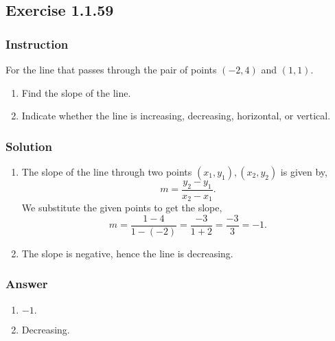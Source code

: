 \subsection*{Exercise 1.1.59}

\subsubsection*{Instruction}

For the line that passes through the pair of points $(-2, 4) $ and $ (1,1)$.

\begin{enumerate}[label = (\alph*)]
  \item
    Find the slope of the line.
  \item
    Indicate whether the line is increasing, decreasing, horizontal, or vertical.

\end{enumerate}

\subsubsection*{Solution}

\begin{enumerate}[label = (\alph*)]
  \item
    The slope of the line through two points $(x_1, y_1), (x_2, y_2)$ is given by,
    \[ \phantom{.} m = \frac{y_2 - y_1}{x_2 - x_1}. \]
    We substitute the given points to get the slope,
    \[ \phantom{.} m = \frac{1 - 4}{1 - (-2)} = \frac{-3}{1 + 2} = \frac{-3}{3} = -1. \]
  \item
    The slope is negative, hence the line is decreasing.

\end{enumerate}

\subsubsection*{Answer}

\begin{enumerate}[label = (\alph*)]
  \item
    $-1.$
  \item
    Decreasing.
\end{enumerate}
